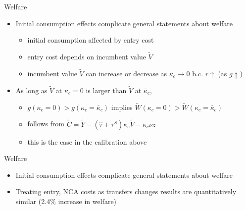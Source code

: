 \documentclass[english,usenames,dvipsnames]{beamer}
\begin{document}
\begin{frame}{Welfare}\label{welfare_details}
	\hyperlink{reducing_kappa_c_table}{}
	\begin{itemize}
		\item Initial consumption effects complicate general statements about welfare
		\begin{itemize}
			\item initial consumption affected by entry cost
			\item entry cost depends on incumbent value $\tilde{V}$ 
			\item incumbent value $\tilde{V}$ can increase or decrease as $\kappa_c \to 0$ b.c. $r \uparrow$ (as $g \uparrow$)
		\end{itemize}
		\medskip
		\item As long as $\tilde{V}$ at $\kappa_c = 0$ is larger than $\tilde{V}$ at $\bar{\kappa}_c$,
		\begin{itemize}
			\item $g(\kappa_c = 0) > g(\kappa_c = \bar{\kappa}_c)$ implies $\tilde{W}(\kappa_c = 0) > \tilde{W}(\kappa_c = \bar{\kappa}_c)$
			\smallskip
			\item follows from $\tilde{C} = \tilde{Y} - (\hat{\tau} + \tau^S)\kappa_e \tilde{V} - \kappa_c \nu z$
			\item this is the case in the calibration above
		\end{itemize}
	\end{itemize}
\end{frame}

\begin{frame}{Welfare}\label{welfare_varyingKappaC}
	\begin{itemize}
		\item Initial consumption effects complicate general statements about welfare \hyperlink{welfare_details}{}
		\item Treating entry, NCA costs as transfers changes results are quantitatively similar (2.4\% increase in welfare) \hyperlink{welfare_costsAreTransfers}{}
	\end{itemize}
\end{frame}
\end{document}
